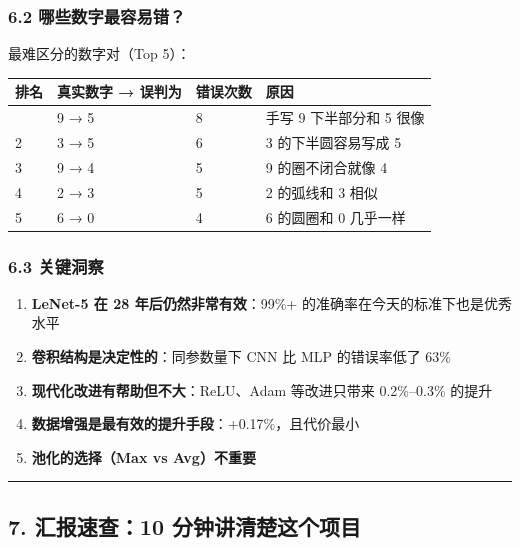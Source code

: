 \documentclass[
  11pt,
]{ctexart}
\newcounter{none} %
\providecommand{\tightlist}{%
  \setlength{\itemsep}{0pt}\setlength{\parskip}{0pt}}
\begin{document}
\subsubsection{6.2
哪些数字最容易错？}\label{ux54eaux4e9bux6570ux5b57ux6700ux5bb9ux6613ux9519}

最难区分的数字对（Top 5）：

{\def\LTcaptype{none} %
\begin{longtable}[]{@{}llll@{}}
\toprule\noalign{}
排名 & 真实数字 → 误判为 & 错误次数 & 原因 \\
\midrule\noalign{}
\endhead
\bottomrule\noalign{}
\endlastfoot
1 & 9 → 5 & 8 & 手写 9 下半部分和 5 很像 \\
2 & 3 → 5 & 6 & 3 的下半圆容易写成 5 \\
3 & 9 → 4 & 5 & 9 的圈不闭合就像 4 \\
4 & 2 → 3 & 5 & 2 的弧线和 3 相似 \\
5 & 6 → 0 & 4 & 6 的圆圈和 0 几乎一样 \\
\end{longtable}
}

\subsubsection{6.3 关键洞察}\label{ux5173ux952eux6d1eux5bdf}

\begin{enumerate}
\def\labelenumi{\arabic{enumi}.}
\tightlist
\item
  \textbf{LeNet-5 在 28 年后仍然非常有效}：99\%+
  的准确率在今天的标准下也是优秀水平
\item
  \textbf{卷积结构是决定性的}：同参数量下 CNN 比 MLP 的错误率低了 63\%
\item
  \textbf{现代化改进有帮助但不大}：ReLU、Adam 等改进只带来 0.2\%–0.3\%
  的提升
\item
  \textbf{数据增强是最有效的提升手段}：+0.17\%，且代价最小
\item
  \textbf{池化的选择（Max vs Avg）不重要}
\end{enumerate}

\begin{center}\rule{0.5\linewidth}{0.5pt}\end{center}

\subsection{7. 汇报速查：10
分钟讲清楚这个项目}\label{ux6c47ux62a5ux901fux67e510-ux5206ux949fux8bb2ux6e05ux695aux8fd9ux4e2aux9879ux76ee}
\end{document}
